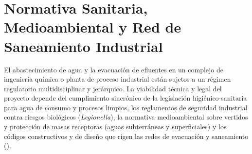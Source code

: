\documentclass{report}
\begin{document}
\chapter{Normativa Sanitaria, Medioambiental y Red de Saneamiento Industrial}

El abastecimiento de agua y la evacuación de efluentes en un complejo de ingeniería química o planta de proceso industrial están sujetos a un régimen regulatorio multidisciplinar y jerárquico. La viabilidad técnica y legal del proyecto depende del cumplimiento sincrónico de la legislación higiénico-sanitaria para agua de consumo y procesos limpios, los reglamentos de seguridad industrial contra riesgos biológicos (\textit{Legionella}), la normativa medioambiental sobre vertidos y protección de masas receptoras (aguas subterráneas y superficiales) y los códigos constructivos y de diseño que rigen las redes de evacuación y saneamiento (\cite{TRLA2001, RDPH1986, RD3_2023, RD487_2022, UNE_EN_752, CTE_DB_HS5, UNE_EN_ISO_129_1, ISO_4067_1, ISO_4067_6}).
\end{document}
